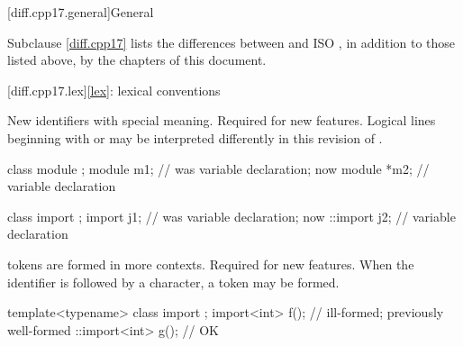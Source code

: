 [diff.cpp17.general]{General}

\pnum
{}%
Subclause \ref{diff.cpp17} lists the differences between \Cpp{} and
ISO \CppXVII{},
in addition to those listed above,
by the chapters of this document.

[diff.cpp17.lex]{\ref{lex}: lexical conventions}

\change
New identifiers with special meaning.
\rationale
Required for new features.
\effect
Logical lines beginning with
 or  may
be interpreted differently
in this revision of \Cpp{}.
\begin{example}
\begin{codeblock}
class module {};
module m1;          // was variable declaration; now 
module *m2;         // variable declaration

class import {};
import j1;          // was variable declaration; now 
::import j2;        // variable declaration
\end{codeblock}
\end{example}

\change
{} tokens are formed in more contexts.
\rationale
Required for new features.
\effect
When the identifier 
is followed by a \tcode{<} character,
a  token may be formed.
\begin{example}
\begin{codeblock}
template<typename> class import {};
import<int> f();                // ill-formed; previously well-formed
::import<int> g();              // OK
\end{codeblock}
\end{example}

